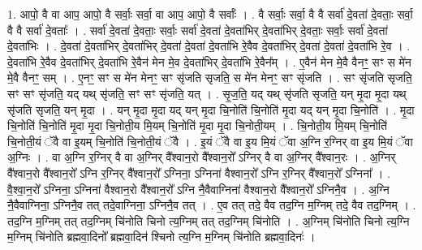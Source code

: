 \documentclass[17pt]{extarticle}
\begin{document}
1. आपो॒ वै वा आप॒ आपो॒ वै सर्वाः॒ सर्वा॒ वा आप॒ आपो॒ वै सर्वाः᳚ । . वै सर्वाः॒ सर्वा॒ वै वै सर्वा॑ दे॒वता॑ दे॒वताः॒ सर्वा॒ वै वै सर्वा॑ दे॒वताः᳚ । . सर्वा॑ दे॒वता॑ दे॒वताः॒ सर्वाः॒ सर्वा॑ दे॒वता॑ दे॒वता॑भिर् दे॒वता॑भिर् दे॒वताः॒ सर्वाः॒ सर्वा॑ दे॒वता॑ दे॒वता॑भिः । . दे॒वता॑ दे॒वता॑भिर् दे॒वता॑भिर् दे॒वता॑ दे॒वता॑ दे॒वता॑भि रे॒वैव दे॒वता॑भिर् दे॒वता॑ दे॒वता॑ दे॒वता॑भि रे॒व । . दे॒वता॑भि रे॒वैव दे॒वता॑भिर् दे॒वता॑भि रे॒वैन॑ मेन मे॒व दे॒वता॑भिर् दे॒वता॑भि रे॒वैन᳚म् । . ए॒वैन॑ मेन मे॒वै वैनꣳ॒॒ सꣳ स मे॑न मे॒वै वैनꣳ॒॒ सम् । . ए॒नꣳ॒॒ सꣳ स मे॑न मेनꣳ॒॒ सꣳ सृ॑जति सृजति॒ स मे॑न मेनꣳ॒॒ सꣳ सृ॑जति । . सꣳ सृ॑जति सृजति॒ सꣳ सꣳ सृ॑जति॒ यद् यथ् सृ॑जति॒ सꣳ सꣳ सृ॑जति॒ यत् । . सृ॒ज॒ति॒ यद् यथ् सृ॑जति सृजति॒ यन् मृ॒दा मृ॒दा यथ् सृ॑जति सृजति॒ यन् मृ॒दा । . यन् मृ॒दा मृ॒दा यद् यन् मृ॒दा चि॒नोति॑ चि॒नोति॑ मृ॒दा यद् यन् मृ॒दा चि॒नोति॑ । . मृ॒दा चि॒नोति॑ चि॒नोति॑ मृ॒दा मृ॒दा चि॒नोती॒य मि॒यम् चि॒नोति॑ मृ॒दा मृ॒दा चि॒नोती॒यम् । . चि॒नोती॒य मि॒यम् चि॒नोति॑ चि॒नोती॒यं ॅवै वा इ॒यम् चि॒नोति॑ चि॒नोती॒यं ॅवै । . इ॒यं ॅवै वा इ॒य मि॒यं ॅवा अ॒ग्नि र॒ग्निर् वा इ॒य मि॒यं ॅवा अ॒ग्निः । . वा अ॒ग्नि र॒ग्निर् वै वा अ॒ग्निर् वै᳚श्वान॒रो वै᳚श्वान॒रो᳚ ऽग्निर् वै वा अ॒ग्निर् वै᳚श्वान॒रः । . अ॒ग्निर् वै᳚श्वान॒रो वै᳚श्वान॒रो᳚ ऽग्नि र॒ग्निर् वै᳚श्वान॒रो᳚ ऽग्निना॒ ऽग्निना॑ वैश्वान॒रो᳚ ऽग्नि र॒ग्निर् वै᳚श्वान॒रो᳚ ऽग्निना᳚ । . वै॒श्वा॒न॒रो᳚ ऽग्निना॒ ऽग्निना॑ वैश्वान॒रो वै᳚श्वान॒रो᳚ ऽग्नि नै॒वैवाग्निना॑ वैश्वान॒रो वै᳚श्वान॒रो᳚ ऽग्निनै॒व । . अ॒ग्नि नै॒वैवाग्निना॒ ऽग्निनै॒व तत् तदे॒वाग्निना॒ ऽग्निनै॒व तत् । . ए॒व तत् तदे॒ वैव तद॒ग्नि म॒ग्निम् तदे॒ वैव तद॒ग्निम् । . तद॒ग्नि म॒ग्निम् तत् तद॒ग्निम् चि॑नोति चिनो त्य॒ग्निम् तत् तद॒ग्निम् चि॑नोति । . अ॒ग्निम् चि॑नोति चिनो त्य॒ग्नि म॒ग्निम् चि॑नोति ब्रह्मवा॒दिनो᳚ ब्रह्मवा॒दिन॑ श्चिनो त्य॒ग्नि म॒ग्निम् चि॑नोति ब्रह्मवा॒दिनः॑ । \newline
\end{document}
